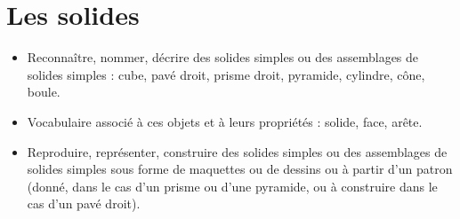 \themaG
\graphicspath{{../Ch23_Les_solides/Images/}}

\chapter{Les solides}
\label{C27}

\newcommand{\cone}{\pspolygon[fillstyle=solid,fillcolor=white](0,0)(0.9,0)(0.45,1.7)}
\newcommand{\boule}{\pscircle[fillstyle=solid,fillcolor=white](0,0.45){0.45}}
\newcommand{\cube}{\psframe[fillstyle=solid,fillcolor=white](0,0)(1.15,0.9)\psline(0.75,0)(0.75,0.9)}
\newcommand{\cubeg}{\psframe[fillstyle=solid,fillcolor=white](0,0)(1.15,0.9)\psline(0.4,0)(0.4,0.9)}
\newcommand{\cubiso}[2]{\rput(#1,#2){\pspolygon[fillstyle=solid,fillcolor=red](0,0)(0,2)(-2,3)(-2,1) \pspolygon[fillstyle=solid,fillcolor=lightgray](0,0)(2,1)(2,3)(0,2) \pspolygon[fillstyle=solid,fillcolor=black](0,2)(2,3)(0,4)(-2,3)}}
       
       
\begin{prerequis}
   \begin{itemize}
      \item Reconnaître, nommer, décrire des solides simples ou des assemblages de solides simples : cube, pavé droit, prisme droit, pyramide, cylindre, cône, boule.
      \item Vocabulaire associé à ces objets et à leurs propriétés : solide, face, arête.
      \item Reproduire, représenter, construire des solides simples ou des assemblages de solides simples sous forme de maquettes ou de dessins ou à partir d’un patron (donné, dans le cas d’un prisme ou d’une pyramide, ou à construire dans le cas d’un pavé droit).
   \end{itemize}
\end{prerequis}

\vfill

